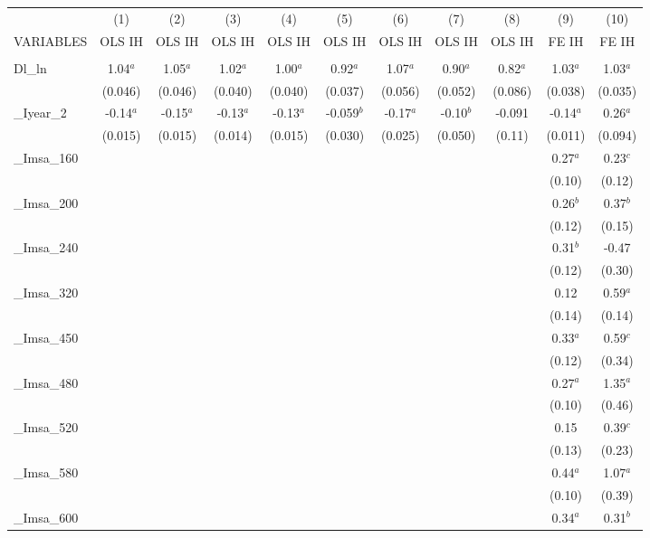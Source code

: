 \documentclass[]{article}
\begin{document}
\begin{tabular}{lcccccccccc} \hline
 & (1) & (2) & (3) & (4) & (5) & (6) & (7) & (8) & (9) & (10) \\
VARIABLES & OLS IH & OLS IH & OLS IH & OLS IH & OLS IH & OLS IH & OLS IH & OLS IH & FE IH & FE IH \\ \hline
 &  &  &  &  &  &  &  &  &  &  \\
Dl\_ln & 1.04$^a$ & 1.05$^a$ & 1.02$^a$ & 1.00$^a$ & 0.92$^a$ & 1.07$^a$ & 0.90$^a$ & 0.82$^a$ & 1.03$^a$ & 1.03$^a$ \\
 & (0.046) & (0.046) & (0.040) & (0.040) & (0.037) & (0.056) & (0.052) & (0.086) & (0.038) & (0.035) \\
\_Iyear\_2 & -0.14$^a$ & -0.15$^a$ & -0.13$^a$ & -0.13$^a$ & -0.059$^b$ & -0.17$^a$ & -0.10$^b$ & -0.091 & -0.14$^a$ & 0.26$^a$ \\
 & (0.015) & (0.015) & (0.014) & (0.015) & (0.030) & (0.025) & (0.050) & (0.11) & (0.011) & (0.094) \\
\_Imsa\_160 &  &  &  &  &  &  &  &  & 0.27$^a$ & 0.23$^c$ \\
 &  &  &  &  &  &  &  &  & (0.10) & (0.12) \\
\_Imsa\_200 &  &  &  &  &  &  &  &  & 0.26$^b$ & 0.37$^b$ \\
 &  &  &  &  &  &  &  &  & (0.12) & (0.15) \\
\_Imsa\_240 &  &  &  &  &  &  &  &  & 0.31$^b$ & -0.47 \\
 &  &  &  &  &  &  &  &  & (0.12) & (0.30) \\
\_Imsa\_320 &  &  &  &  &  &  &  &  & 0.12 & 0.59$^a$ \\
 &  &  &  &  &  &  &  &  & (0.14) & (0.14) \\
\_Imsa\_450 &  &  &  &  &  &  &  &  & 0.33$^a$ & 0.59$^c$ \\
 &  &  &  &  &  &  &  &  & (0.12) & (0.34) \\
\_Imsa\_480 &  &  &  &  &  &  &  &  & 0.27$^a$ & 1.35$^a$ \\
 &  &  &  &  &  &  &  &  & (0.10) & (0.46) \\
\_Imsa\_520 &  &  &  &  &  &  &  &  & 0.15 & 0.39$^c$ \\
 &  &  &  &  &  &  &  &  & (0.13) & (0.23) \\
\_Imsa\_580 &  &  &  &  &  &  &  &  & 0.44$^a$ & 1.07$^a$ \\
 &  &  &  &  &  &  &  &  & (0.10) & (0.39) \\
\_Imsa\_600 &  &  &  &  &  &  &  &  & 0.34$^a$ & 0.31$^b$ \\

\end{tabular}
\end{document}
